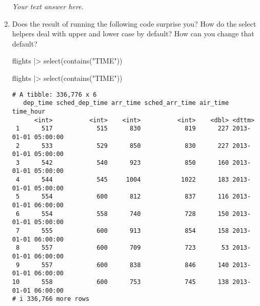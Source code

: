 \documentclass[
  letterpaper,
  DIV=11,
  numbers=noendperiod]{scrreprt}
\newenvironment{Shaded}{\begin{snugshade}}{\end{snugshade}}
\newcommand{\FunctionTok}[1]{\textcolor[rgb]{0.28,0.35,0.67}{#1}}
\newcommand{\NormalTok}[1]{\textcolor[rgb]{0.00,0.23,0.31}{#1}}
\newcommand{\SpecialCharTok}[1]{\textcolor[rgb]{0.37,0.37,0.37}{#1}}
\newcommand{\StringTok}[1]{\textcolor[rgb]{0.13,0.47,0.30}{#1}}
\begin{document}
\begin{enumerate}
  \begin{tcolorbox}[enhanced jigsaw, left=2mm, rightrule=.15mm, bottomtitle=1mm, opacitybacktitle=0.6, leftrule=.75mm, opacityback=0, colframe=quarto-callout-note-color-frame, bottomrule=.15mm, coltitle=black, toptitle=1mm, colback=white, titlerule=0mm, colbacktitle=quarto-callout-note-color!10!white, title={Answer}, toprule=.15mm, breakable, arc=.35mm]

  \emph{Your text answer here.}

  \end{tcolorbox}
\item
  Does the result of running the following code surprise you? How do the
  select helpers deal with upper and lower case by default? How can you
  change that default?

\begin{Shaded}
\begin{Highlighting}[]
\NormalTok{flights }\SpecialCharTok{|\textgreater{}} 
  \FunctionTok{select}\NormalTok{(}\FunctionTok{contains}\NormalTok{(}\StringTok{"TIME"}\NormalTok{))}
\end{Highlighting}
\end{Shaded}

  \begin{tcolorbox}[enhanced jigsaw, left=2mm, rightrule=.15mm, bottomtitle=1mm, opacitybacktitle=0.6, leftrule=.75mm, opacityback=0, colframe=quarto-callout-note-color-frame, bottomrule=.15mm, coltitle=black, toptitle=1mm, colback=white, titlerule=0mm, colbacktitle=quarto-callout-note-color!10!white, title={Answer}, toprule=.15mm, breakable, arc=.35mm]

\begin{Shaded}
\begin{Highlighting}[]
\NormalTok{flights }\SpecialCharTok{|\textgreater{}} 
  \FunctionTok{select}\NormalTok{(}\FunctionTok{contains}\NormalTok{(}\StringTok{"TIME"}\NormalTok{))}
\end{Highlighting}
\end{Shaded}

\begin{verbatim}
# A tibble: 336,776 x 6
   dep_time sched_dep_time arr_time sched_arr_time air_time time_hour          
      <int>          <int>    <int>          <int>    <dbl> <dttm>             
 1      517            515      830            819      227 2013-01-01 05:00:00
 2      533            529      850            830      227 2013-01-01 05:00:00
 3      542            540      923            850      160 2013-01-01 05:00:00
 4      544            545     1004           1022      183 2013-01-01 05:00:00
 5      554            600      812            837      116 2013-01-01 06:00:00
 6      554            558      740            728      150 2013-01-01 05:00:00
 7      555            600      913            854      158 2013-01-01 06:00:00
 8      557            600      709            723       53 2013-01-01 06:00:00
 9      557            600      838            846      140 2013-01-01 06:00:00
10      558            600      753            745      138 2013-01-01 06:00:00
# i 336,766 more rows
\end{verbatim}


\end{tcolorbox}
\end{enumerate}
\end{document}
